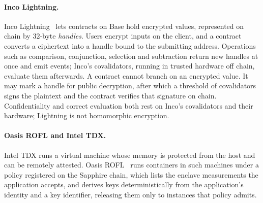 \paragraph{Inco Lightning.} Inco Lightning~\cite{inco} lets contracts on Base hold encrypted values,
represented on chain by 32-byte \emph{handles}. Users encrypt inputs on the client, and a contract converts
a ciphertext into a handle bound to the submitting address. Operations such as comparison, conjunction,
selection and subtraction return new handles at once and emit events; Inco's covalidators, running in
trusted hardware off chain, evaluate them afterwards. A contract cannot branch on an encrypted value. It
may mark a handle for public decryption, after which a threshold of covalidators signs the plaintext and
the contract verifies that signature on chain. Confidentiality and correct evaluation both rest on Inco's
covalidators and their hardware; Lightning is not homomorphic encryption.

\paragraph{Oasis ROFL and Intel TDX.} Intel TDX runs a virtual machine whose memory is protected from the
host and can be remotely attested. Oasis ROFL~\cite{rofl} runs containers in such machines under a policy
registered on the Sapphire chain, which lists the enclave measurements the application accepts, and
derives keys deterministically from the application's identity and a key identifier, releasing them only
to instances that policy admits.
